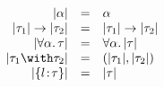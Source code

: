 
\[
\begin{array}{rcl}
  \image \alpha                     & = & \alpha \\
  \image {\tau_1} \to \image {\tau_2} & = & \image {\tau_1} \to \image {\tau_2} \\
  \image {\Forall \alpha \tau}      & = & \Forall \alpha \image \tau \\
  \image {\tau_1 \Intersect \tau_2}   & = & \Pair {\image {\tau_1}} {\image {\tau_2}} \\
  \image {\RecTy l \tau}            & = & \image \tau
\end{array}
\]